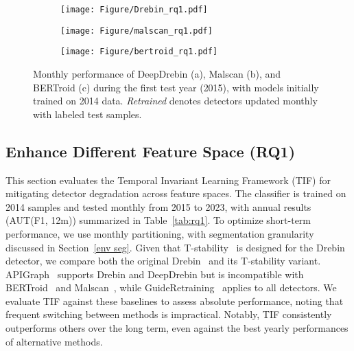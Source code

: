 


\begin{figure}[!t]
    \centering
    \begin{subfigure}{0.15\textwidth}
        \centering
        \texttt{[image: Figure/Drebin\_rq1.pdf]}
        \caption{}
        \label{fig:sub1}
    \end{subfigure}%
    \hfill
    \begin{subfigure}{0.15\textwidth}
        \centering
        \texttt{[image: Figure/malscan\_rq1.pdf]}
        \caption{}
        \label{fig:sub2}
    \end{subfigure}%
    \hfill
    \begin{subfigure}{0.15\textwidth}
        \centering
        \texttt{[image: Figure/bertroid\_rq1.pdf]}
        \caption{}
        \label{fig:sub3}
    \end{subfigure}
    \caption{Monthly performance of DeepDrebin (a), Malscan (b), and BERTroid (c) during the first test year (2015), with models initially trained on 2014 data. \textit{Retrained} denotes detectors updated monthly with labeled test samples.}
    \label{fig:rq1}
    \hfill
\end{figure}


\subsection{Enhance Different Feature Space (RQ1)}
\label{rq1}
This section evaluates the Temporal Invariant Learning Framework (TIF) for mitigating detector degradation across feature spaces. The classifier is trained on 2014 samples and tested monthly from 2015 to 2023, with annual results (AUT(F1, 12m)) summarized in Table~\ref{tab:rq1}. To optimize short-term performance, we use monthly partitioning, with segmentation granularity discussed in Section~\ref{env seg}. Given that T-stability~\cite{svm_ce} is designed for the Drebin detector, we compare both the original Drebin~\cite{Arpdrebin} and its T-stability variant. APIGraph~\cite{apigraph} supports Drebin and DeepDrebin but is incompatible with BERTroid~\cite{bertroid} and Malscan~\cite{malscan}, while GuideRetraining~\cite{guide_retraining} applies to all detectors. We evaluate TIF against these baselines to assess absolute performance, noting that frequent switching between methods is impractical. Notably, TIF consistently outperforms others over the long term, even against the best yearly performances of alternative methods. 

